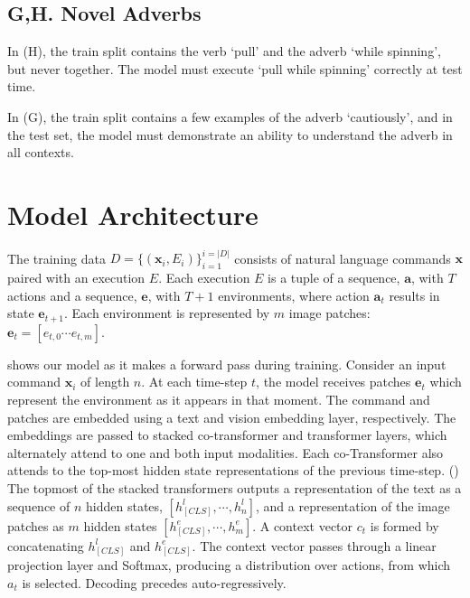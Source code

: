 \documentclass[11pt]{article}
\begin{document}
\subsection*{G,H. Novel Adverbs}
In (H), the train split contains the verb `pull' and the adverb `while spinning', but never together. 
%
The model must execute `pull while spinning' correctly at test time. 

In (G), the train split contains a few examples of the adverb `cautiously', and in the test set, the model must demonstrate an ability to understand the adverb in all contexts.

\section{Model Architecture}
The training data $D=\{(\mathbf{x}_i, E_i) \}_{i=1}^{i=|D|}$ consists of natural language commands $\mathbf{x}$ paired with an execution $E$. 
%
Each execution $E$ is a tuple of a sequence, $\mathbf{a}$, with $T$ actions and a sequence, $\mathbf{e}$, with $T+1$ environments, where action $\mathbf{a}_t$ results in state  $\mathbf{e}_{t+1}$. 
%
Each environment is represented by $m$ image patches: $\mathbf{e}_{t} = [e_{t,0}\cdots e_{t,m}]$.
%

 shows our model as it makes a forward pass during training.
%
Consider an input command $\mathbf{x}_{i}$ of length $n$.
%
At each time-step $t$, the model receives patches $\mathbf{e}_t$ which represent the environment as it appears in that moment. 
%
The command and patches are embedded using a text and vision embedding layer, respectively. 
%
The embeddings are passed to stacked co-transformer and transformer layers, which alternately attend to one and both input modalities.
%
Each co-Transformer also attends to the top-most hidden state representations of the previous time-step.
%
()
%
The topmost of the stacked transformers outputs a representation of the text as a sequence of $n$ hidden states, $[h_{[CLS]}^l,\cdots,h_{n}^l]$, and a representation of the image patches as $m$ hidden states $[h^e_{[CLS]}, \cdots, h^{e}_{m}]$.
%
A context vector $c_t$ is formed by concatenating $h_{[CLS]}^l$ and $h_{[CLS]}^e$.
%
The context vector passes through a linear projection layer and Softmax, producing a distribution over actions, from which $a_t$ is selected.
%
Decoding precedes auto-regressively.
\end{document}
